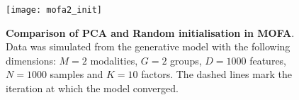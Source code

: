 \begin{figure}[H]
	\centering
	\texttt{[image: mofa2\_init]}
	\caption[]{
	\textbf{Comparison of PCA and Random initialisation in MOFA}.\\ Data was simulated from the generative model with the following dimensions: $M=2$ modalities, $G=2$ groups, $D=1000$ features, $N=1000$ samples and $K=10$ factors. The dashed lines mark the iteration at which the model converged.
	}
	\label{fig:mofa2_init}
\end{figure}



